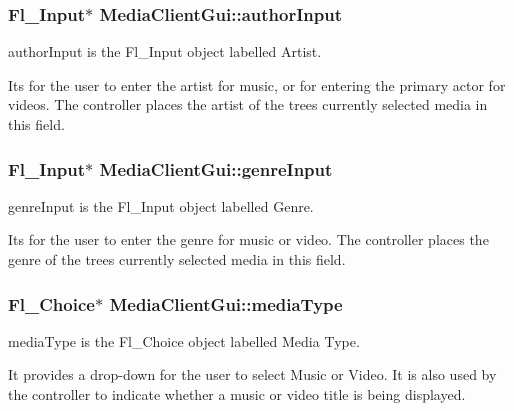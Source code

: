 \subsubsection[{author\+Input}]{\setlength{\rightskip}{0pt plus 5cm}Fl\+\_\+\+Input$\ast$ Media\+Client\+Gui\+::author\+Input\hspace{0.3cm}{\ttfamily [protected]}}\label{class_media_client_gui_adb0217d9d234ca6036f09bb17d89ad1a}


author\+Input is the Fl\+\_\+\+Input object labelled Artist. 

Its for the user to enter the artist for music, or for entering the primary actor for videos. The controller places the artist of the tree\textquotesingle{}s currently selected media in this field. \hypertarget{class_media_client_gui_a4724db5935d76a402c21c2bdc376a2f9}{}
\subsubsection[{genre\+Input}]{\setlength{\rightskip}{0pt plus 5cm}Fl\+\_\+\+Input$\ast$ Media\+Client\+Gui\+::genre\+Input\hspace{0.3cm}{\ttfamily [protected]}}\label{class_media_client_gui_a4724db5935d76a402c21c2bdc376a2f9}


genre\+Input is the Fl\+\_\+\+Input object labelled Genre. 

Its for the user to enter the genre for music or video. The controller places the genre of the tree\textquotesingle{}s currently selected media in this field. \hypertarget{class_media_client_gui_a8352bda5833f6e4ce4bcb760cae27ebe}{}
\subsubsection[{media\+Type}]{\setlength{\rightskip}{0pt plus 5cm}Fl\+\_\+\+Choice$\ast$ Media\+Client\+Gui\+::media\+Type\hspace{0.3cm}{\ttfamily [protected]}}\label{class_media_client_gui_a8352bda5833f6e4ce4bcb760cae27ebe}


media\+Type is the Fl\+\_\+\+Choice object labelled Media Type. 

It provides a drop-\/down for the user to select Music or Video. It is also used by the controller to indicate whether a music or video title is being displayed. \hypertarget{class_media_client_gui_a3e4fe22653dbf41f11c14f5a572e79c8}{}
